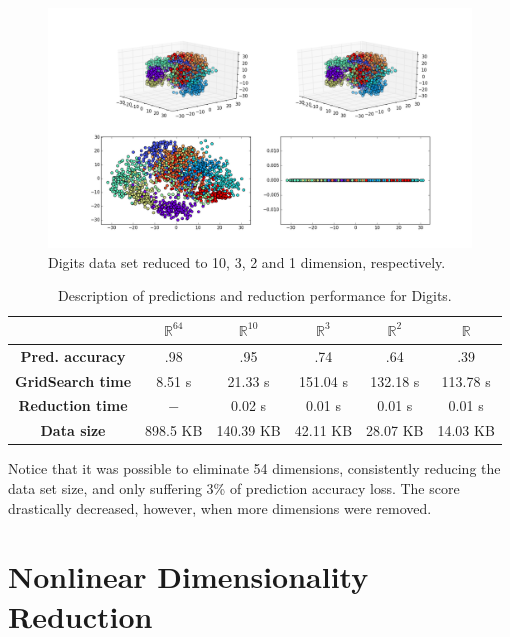 \documentclass[12pt]{article}
\begin{document}
\begin{figure}[H]
	\centering
	\captionsetup{justification=centering}
	\includegraphics[width=\linewidth]{dsdigitspca}
	\caption{Digits data set reduced to 10, 3, 2 and 1 dimension, respectively.}
	\label{fig:dsdigitspca}
\end{figure}

\begin{table}[H]
	\centering
	\begin{tabular}{|c|c|c|c|c|c|}
		\hline
		& \textbf{$\mathbb{R}^{64}$} & \textbf{$\mathbb{R}^{10}$} & \textbf{$\mathbb{R}^3$} & \textbf{$\mathbb{R}^2$} & \textbf{$\mathbb{R}$} \\\hline
		\textbf{Pred. accuracy}   & .98 & .95 & .74 & .64 & .39 \\\hline
		\textbf{GridSearch time} & 8.51 s & 21.33 s & 151.04 s & 132.18 s & 113.78 s \\\hline
		\textbf{Reduction time} & $-$ & 0.02 s & 0.01 s & 0.01 s & 0.01 s \\\hline
			\textbf{Data size} & 898.5 KB & 140.39 KB & 42.11 KB & 28.07 KB & 14.03 KB \\\hline
	\end{tabular}

	\caption{Description of predictions and reduction performance for Digits.}
\end{table}

Notice that it was possible to eliminate 54 dimensions, consistently reducing the data set size, and only suffering 3\% of prediction accuracy loss. The score drastically decreased, however, when more dimensions were removed.

\section{Nonlinear Dimensionality Reduction}
\end{document}
